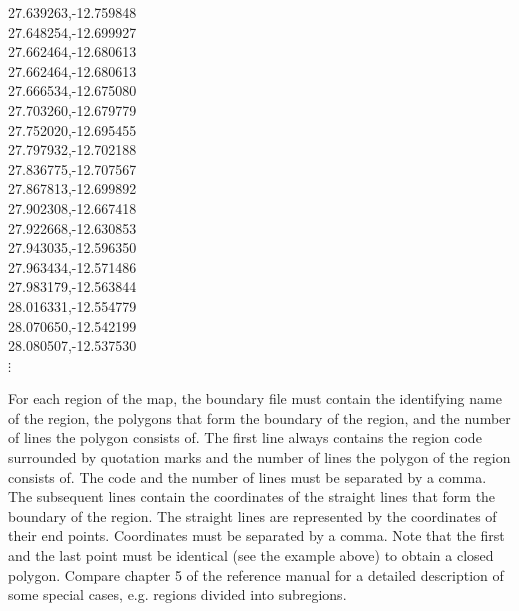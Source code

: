  27.639263,-12.759848\\
 27.648254,-12.699927\\
 27.662464,-12.680613\\
 27.662464,-12.680613\\
 27.666534,-12.675080\\
 27.703260,-12.679779\\
 27.752020,-12.695455\\
 27.797932,-12.702188\\
 27.836775,-12.707567\\
 27.867813,-12.699892\\
 27.902308,-12.667418\\
 27.922668,-12.630853\\
 27.943035,-12.596350\\
 27.963434,-12.571486\\
 27.983179,-12.563844\\
 28.016331,-12.554779\\
 28.070650,-12.542199\\
 28.080507,-12.537530\\

\hspace{1cm} $\vdots$

\normalsize

\vspace{0.3cm}

For each region of the map, the boundary file must contain the identifying name of the region, the polygons that form the
boundary of the region, and the number of lines the polygon consists of. The first line always contains the region code
surrounded by quotation marks and the number of lines the polygon of the region consists of. The code and the number of lines
must be separated by a comma. The subsequent lines contain the coordinates of the straight lines that form the boundary of the
region. The straight lines are represented by the coordinates of their end points. Coordinates must be separated by a comma.
Note that the first and the last point must be identical (see the example above) to obtain a closed polygon. Compare chapter 5
of the reference manual for a detailed description of some special cases, e.g. regions divided into subregions.

